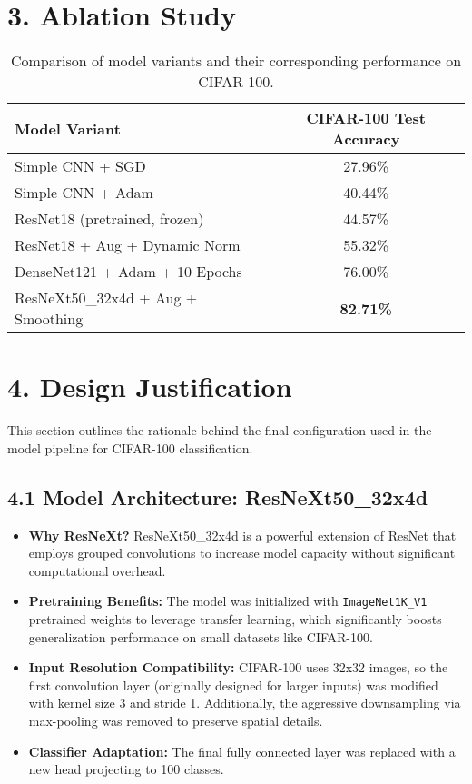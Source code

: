 \documentclass{article}
\begin{document}
\section*{3. Ablation Study}

\begin{table}[H]
\centering
\begin{tabular}{@{}|l|c|@{}}
\hline
\textbf{Model Variant} & \textbf{CIFAR-100 Test Accuracy} \\
\hline
Simple CNN + SGD & 27.96\% \\
Simple CNN + Adam & 40.44\% \\
ResNet18 (pretrained, frozen) & 44.57\% \\
ResNet18 + Aug + Dynamic Norm & 55.32\% \\
DenseNet121 + Adam + 10 Epochs & 76.00\% \\
ResNeXt50\_32x4d + Aug + Smoothing & \textbf{82.71\%} \\
\hline
\end{tabular}
\caption{Comparison of model variants and their corresponding performance on CIFAR-100.}
\end{table}

\section*{4. Design Justification}

This section outlines the rationale behind the final configuration used in the model pipeline for CIFAR-100 classification.

\subsection*{4.1 Model Architecture: ResNeXt50\_32x4d}
\begin{itemize}
    \item \textbf{Why ResNeXt?} ResNeXt50\_32x4d is a powerful extension of ResNet that employs grouped convolutions to increase model capacity without significant computational overhead.
    \item \textbf{Pretraining Benefits:} The model was initialized with \texttt{ImageNet1K\_V1} pretrained weights to leverage transfer learning, which significantly boosts generalization performance on small datasets like CIFAR-100.
    \item \textbf{Input Resolution Compatibility:} CIFAR-100 uses 32x32 images, so the first convolution layer (originally designed for larger inputs) was modified with kernel size 3 and stride 1. Additionally, the aggressive downsampling via max-pooling was removed to preserve spatial details.
    \item \textbf{Classifier Adaptation:} The final fully connected layer was replaced with a new head projecting to 100 classes.
\end{itemize}
\end{document}
